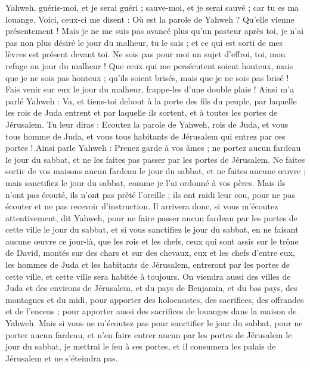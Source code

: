 \begin{multicols}{2}
Yahweh, guéris-moi, et je serai guéri ; sauve-moi, et je serai sauvé ; car tu es ma louange.
Voici, ceux-ci me disent : Où est la parole de Yahweh ? Qu'elle vienne présentement !
Mais je ne me suis pas avancé plus qu’un pasteur après toi, je n'ai pas non plus désiré le jour du malheur, tu le sais ; et ce qui est sorti de mes lèvres est présent devant toi.
Ne sois pas pour moi un sujet d'effroi, toi, mon refuge au jour du malheur !
Que ceux qui me persécutent soient honteux, mais que je ne sois pas honteux ; qu'ils soient brisés, mais que je ne sois pas brisé ! Fais venir sur eux le jour du malheur, frappe-les d'une double plaie !
Ainsi m'a parlé Yahweh : Va, et tiens-toi debout à la porte des fils du peuple, par laquelle les rois de Juda entrent et par laquelle ils sortent, et à toutes les portes de Jérusalem.
Tu leur diras : Ecoutez la parole de Yahweh, rois de Juda, et vous tous homme de Juda, et vous tous habitants de Jérusalem qui entrez par ces portes !
Ainsi parle Yahweh : Prenez garde à vos âmes ; ne portez aucun fardeau le jour du sabbat, et ne les faites pas passer par les portes de Jérusalem.
Ne faites sortir de vos maisons aucun fardeau le jour du sabbat, et ne faites aucune œuvre ; mais sanctifiez le jour du sabbat, comme je l'ai ordonné à vos pères.
Mais ils n'ont pas écouté, ils n'ont pas prêté l'oreille ; ils ont raidi leur cou, pour ne pas écouter et ne pas recevoir d'instruction.
Il arrivera donc, si vous m'écoutez attentivement, dit Yahweh, pour ne faire passer aucun fardeau par les portes de cette ville le jour du sabbat, et si vous sanctifiez le jour du sabbat, en ne faisant aucune œuvre ce jour-là,
que les rois et les chefs, ceux qui sont assis sur le trône de David, montés sur des chars et sur des chevaux, eux et les chefs d'entre eux, les hommes de Juda et les habitants de Jérusalem, entreront par les portes de cette ville, et cette ville sera habitée à toujours.
On viendra aussi des villes de Juda et des environs de Jérusalem, et du pays de Benjamin, et du bas pays, des montagnes et du midi, pour apporter des holocaustes, des sacrifices, des offrandes et de l'encens ; pour apporter aussi des sacrifices de louanges dans la maison de Yahweh.
Mais si vous ne m'écoutez pas pour sanctifier le jour du sabbat, pour ne porter aucun fardeau, et n'en faire entrer aucun par les portes de Jérusalem le jour du sabbat, je mettrai le feu à ses portes, et il consumera les palais de Jérusalem et ne s'éteindra pas.

\end{multicols}
